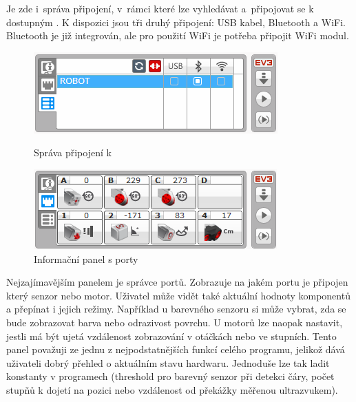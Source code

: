 Je zde i~správa připojení, v~rámci které lze vyhledávat a~připojovat se k dostupným . 
K dispozici jsou tři druhý připojení: USB kabel, Bluetooth a WiFi. Bluetooth je již integrován, ale pro použití WiFi je potřeba připojit WiFi modul.

\begin{figure}[h]
	\begin{minipage}[b]{.48\textwidth}
		\centering
		\includegraphics[width=\textwidth]{images/lego-soft/lego-soft_brick-manager_connected.png}
		\caption{Správa připojení k }
		\label{fig:lego-soft_brick-manager-connected}
	\end{minipage}
	\hfill
	\begin{minipage}[b]{.48\textwidth}
		\centering
		\includegraphics[width=\textwidth]{images/lego-soft/lego-soft_brick_port-view.png}
		\caption{Informační panel s porty}
		\label{fig:lego-soft_brick_port-view}
	\end{minipage}
\end{figure}
Nejzajímavějším panelem je správce portů. 
Zobrazuje na jakém portu je připojen který senzor nebo motor. 
Uživatel může vidět také aktuální hodnoty komponentů a přepínat i jejich režimy.    
Například u barevného senzoru si může vybrat, zda se bude zobrazovat barva nebo odrazivost povrchu. U motorů lze naopak nastavit, jestli má být ujetá vzdálenost zobrazování v otáčkách nebo ve stupních. 
Tento panel považuji ze jednu z nejpodstatnějších funkcí celého programu, jelikož dává uživateli dobrý přehled o aktuálním stavu hardwaru. 
Jednoduše lze tak ladit konstanty v programech (threshold pro barevný senzor při detekci čáry, počet stupňů k dojetí na pozici nebo vzdálenost od překážky měřenou ultrazvukem). \\


